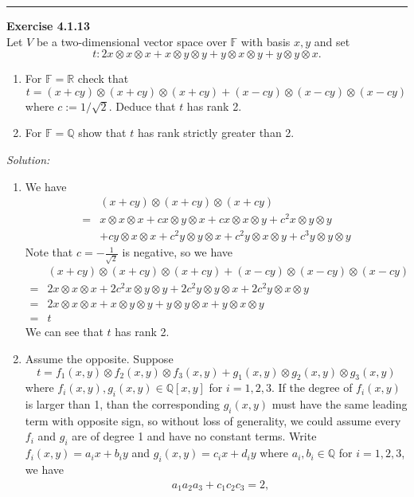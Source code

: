 \documentclass[a4paper, 12pt]{article}
\newenvironment{problem}[2][Exercise]
    { \begin{mdframed}[backgroundcolor=gray!20] \textbf{#1 #2} \\}
    {  \end{mdframed}}
\newenvironment{solution}
    {\textit{Solution:}}
    {}
\begin{document}
\noindent\rule{7in}{2.8pt}
\begin{problem}{4.1.13}
Let \(V\) be a two-dimensional vector space over \(\mathbb{F}\) with basis \(x,y\) and set 
\[t:2x\otimes x\otimes x+x\otimes y\otimes y+y\otimes x\otimes y+y\otimes y\otimes x.\]
\begin{enumerate}[(1)]
	\item For \(\mathbb{F}=\mathbb{R}\) check that 
	      \[t=(x+cy)\otimes (x+cy)\otimes (x+cy)+(x-cy)\otimes (x-cy)\otimes (x-cy)\]
		  where \(c:=1/\sqrt{2}\). Deduce that \(t\) has rank 2.
     \item For \(\mathbb{F}=\mathbb{Q}\) show that \(t\) has rank strictly greater than 2.
\end{enumerate}
\end{problem}
\begin{solution}
\begin{enumerate}[(1)]
\item We have 
\begin{align*}
    &(x+cy)\otimes (x+cy)\otimes (x+cy)\\ 
   =&x\otimes x\otimes x+cx\otimes y\otimes x+cx\otimes x\otimes y+c^2x\otimes y\otimes y\\ 
    &+cy\otimes x\otimes x+c^2y\otimes y\otimes x+c^2 y\otimes x\otimes y+c^3y\otimes y\otimes y 
\end{align*}
Note that \(c=-\frac{1}{\sqrt{2}}\) is negative, so we have 
\begin{align*}
    &(x+cy)\otimes (x+cy)\otimes (x+cy)+(x-cy)\otimes (x-cy)\otimes (x-cy)\\ 
   =&2x\otimes x\otimes x+2c^2x\otimes y\otimes y+2c^2y\otimes y\otimes x+2c^2y\otimes x\otimes y\\ 
   =&2x\otimes x\otimes x+x\otimes y\otimes y+y\otimes y\otimes x+y\otimes x\otimes y\\ 
   =&t 
\end{align*}
We can see that \(t\) has rank 2.
\item Assume the opposite. Suppose 
\[t=f_1(x,y)\otimes f_2(x,y)\otimes f_3(x,y)+g_1(x,y)\otimes g_2(x,y)\otimes g_3(x,y)\]
where \(f_i(x,y),g_i(x,y)\in \mathbb{Q}[x,y]\) for \(i=1,2,3\). If the degree of \(f_i(x,y)\) is larger than 1, than the corresponding \(g_i(x,y)\) must have the same leading term with opposite sign, so 
without loss of generality, we could assume every \(f_i\) and \(g_i\) are of degree 1 and have no constant terms. Write \(f_i(x,y)=a_ix+b_iy\) and \(g_i(x,y)=c_ix+d_iy\) where \(a_i,b_i\in \mathbb{Q}\) for \(i=1,2,3\), we have 
\begin{align*}
    &a_1a_2a_3+c_1c_2c_3=2,\\
    &
\end{align*} 
\end{enumerate}
\end{solution}
\end{document}
